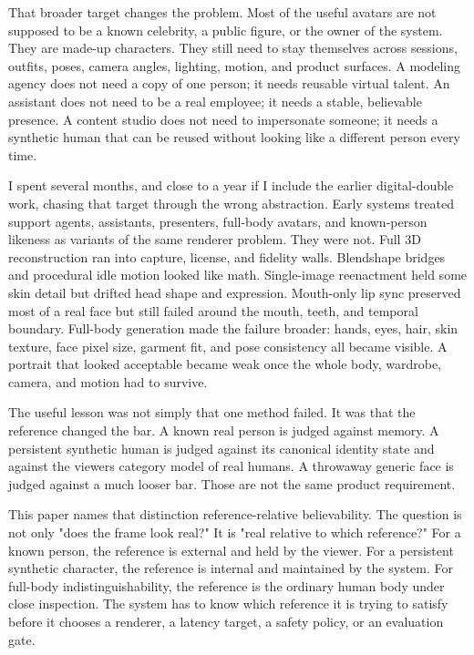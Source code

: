 \documentclass[
]{article}
\begin{document}
That broader target changes the problem. Most of the useful avatars are
not supposed to be a known celebrity, a public figure, or the owner of
the system. They are made-up characters. They still need to stay
themselves across sessions, outfits, poses, camera angles, lighting,
motion, and product surfaces. A modeling agency does not need a copy of
one person; it needs reusable virtual talent. An assistant does not need
to be a real employee; it needs a stable, believable presence. A content
studio does not need to impersonate someone; it needs a synthetic human
that can be reused without looking like a different person every time.

I spent several months, and close to a year if I include the earlier
digital-double work, chasing that target through the wrong abstraction.
Early systems treated support agents, assistants, presenters, full-body
avatars, and known-person likeness as variants of the same renderer
problem. They were not. Full 3D reconstruction ran into capture,
license, and fidelity walls. Blendshape bridges and procedural idle
motion looked like math. Single-image reenactment held some skin detail
but drifted head shape and expression. Mouth-only lip sync preserved
most of a real face but still failed around the mouth, teeth, and
temporal boundary. Full-body generation made the failure broader: hands,
eyes, hair, skin texture, face pixel size, garment fit, and pose
consistency all became visible. A portrait that looked acceptable became
weak once the whole body, wardrobe, camera, and motion had to survive.

The useful lesson was not simply that one method failed. It was that the
reference changed the bar. A known real person is judged against memory.
A persistent synthetic human is judged against its canonical identity
state and against the viewer\textquotesingle s category model of real
humans. A throwaway generic face is judged against a much looser bar.
Those are not the same product requirement.

This paper names that distinction reference-relative believability. The
question is not only "does the frame look real?" It is "real relative to
which reference?" For a known person, the reference is external and held
by the viewer. For a persistent synthetic character, the reference is
internal and maintained by the system. For full-body
indistinguishability, the reference is the ordinary human body under
close inspection. The system has to know which reference it is trying to
satisfy before it chooses a renderer, a latency target, a safety policy,
or an evaluation gate.
\end{document}
